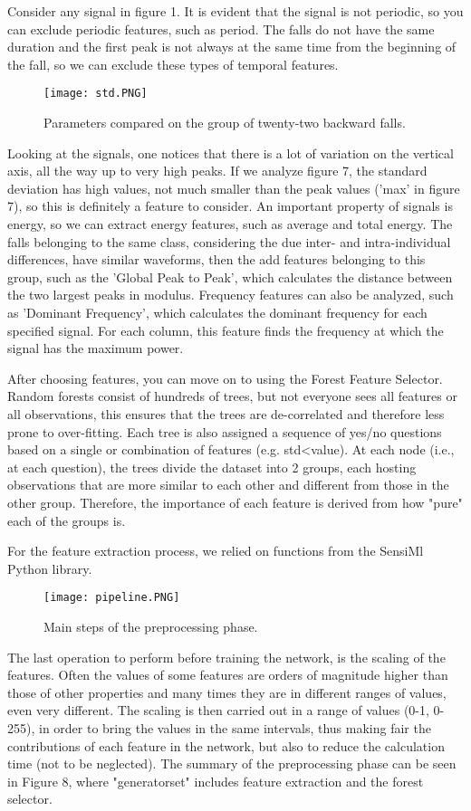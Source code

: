 \documentclass[12pt]{article}
\begin{document}
Consider any signal in figure 1. It is evident that the signal is not periodic, so you can exclude periodic features, such as period. 
The falls do not have the same duration and the first peak is not always at the same time from the beginning of the fall, so we can exclude these types of temporal features.
\begin{wrapfigure}{l}{0pt}
  \texttt{[image: std.PNG]}
  \caption{Parameters compared on the group of twenty-two backward falls.}
\end{wrapfigure}
Looking at the signals, one notices that there is a lot of variation on the vertical axis, all the way up to very high peaks. If we analyze figure 7, the standard deviation has high values, not much smaller than the peak values ('max' in figure 7), so this is definitely a feature to consider.
An important property of signals is energy, so we can extract energy features, such as average and total energy. 
The falls belonging to the same class, considering the due inter- and intra-individual differences, have similar waveforms, then the add features belonging to this group, such as the 'Global Peak to Peak', which calculates the distance between the two largest peaks in modulus. 
Frequency features can also be analyzed, such as 'Dominant Frequency', which calculates the dominant frequency for each specified signal. For each column, this feature finds the frequency at which the signal has the maximum power.

After choosing features, you can move on to using the Forest Feature Selector. Random forests consist of hundreds of trees, but not everyone sees all features or all observations, this ensures that the trees are de-correlated and therefore less prone to over-fitting. Each tree is also assigned a sequence of yes/no questions based on a single or combination of features (e.g. std<value). At each node (i.e., at each question), the trees divide the dataset into 2 groups, each hosting observations that are more similar to each other and different from those in the other group. Therefore, the importance of each feature is derived from how "pure" each of the groups is.

For the feature extraction process, we relied on functions from the SensiMl Python library.

\begin{wrapfigure}{r}{0pt}
  \texttt{[image: pipeline.PNG]}
  \caption{Main steps of the preprocessing phase.}
\end{wrapfigure}
The last operation to perform before training the network, is the scaling of the features. Often the values of some features are orders of magnitude higher than those of other properties and many times they are in different ranges of values, even very different. 
The scaling is then carried out in a range of values (0-1, 0-255), in order to bring the values in the same intervals, thus making fair the contributions of each feature in the network, but also to reduce the calculation time (not to be neglected).
The summary of the preprocessing phase can be seen in Figure 8, where "generatorset" includes feature extraction and the forest selector.
\end{document}
